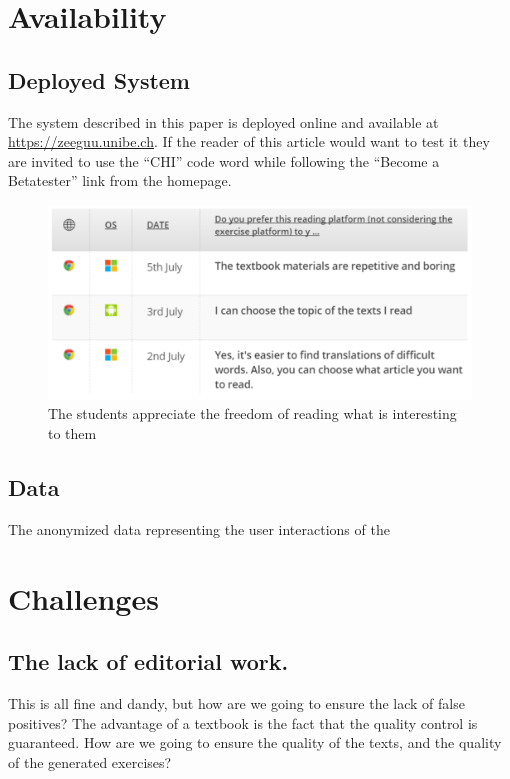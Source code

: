 


\section{Availability}

\subsection{Deployed System}
The system described in this paper is deployed online and available at \url{https://zeeguu.unibe.ch}. If the reader of this article would want to test it they are invited to use the ``CHI'' code word while following the  ``Become a Betatester'' link from the homepage.

\begin{figure}[h!]
\centering
  \includegraphics[width=0.9\columnwidth]{figures/opinion_on_reading_platform}
  \caption{The students appreciate the freedom of reading what is interesting to them }
\end{figure}

\subsection{Data}
The anonymized data representing the user interactions of the 




\newpage
\section{Challenges}

\subsection{The lack of editorial work.}
This is all fine and dandy, but how are we going to ensure the lack of false positives? The advantage of a textbook is the fact that the quality control is guaranteed. How are we going to ensure the quality of the texts, and the quality of the generated exercises? 


